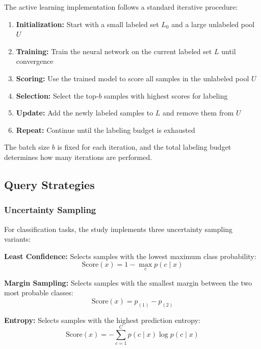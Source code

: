 \documentclass[conference]{IEEEtran}
\begin{document}
The active learning implementation follows a standard iterative procedure:

\begin{enumerate}
\item \textbf{Initialization:} Start with a small labeled set $L_0$ and a large unlabeled pool $U$
\item \textbf{Training:} Train the neural network on the current labeled set $L$ until convergence
\item \textbf{Scoring:} Use the trained model to score all samples in the unlabeled pool $U$
\item \textbf{Selection:} Select the top-$b$ samples with highest scores for labeling
\item \textbf{Update:} Add the newly labeled samples to $L$ and remove them from $U$
\item \textbf{Repeat:} Continue until the labeling budget is exhausted
\end{enumerate}

The batch size $b$ is fixed for each iteration, and the total labeling budget determines how many iterations are performed.

\subsection{Query Strategies}

\subsubsection{Uncertainty Sampling}

For classification tasks, the study implements three uncertainty sampling variants:

\textbf{Least Confidence:} Selects samples with the lowest maximum class probability:
\begin{equation}
\text{Score}(x) = 1 - \max_c p(c \mid x)
\end{equation}

\textbf{Margin Sampling:} Selects samples with the smallest margin between the two most probable classes:
\begin{equation}
\text{Score}(x) = p_{(1)} - p_{(2)}
\end{equation}

\textbf{Entropy:} Selects samples with the highest prediction entropy:
\begin{equation}
\text{Score}(x) = -\sum_{c=1}^C p(c \mid x) \log p(c \mid x)
\end{equation}
\end{document}
